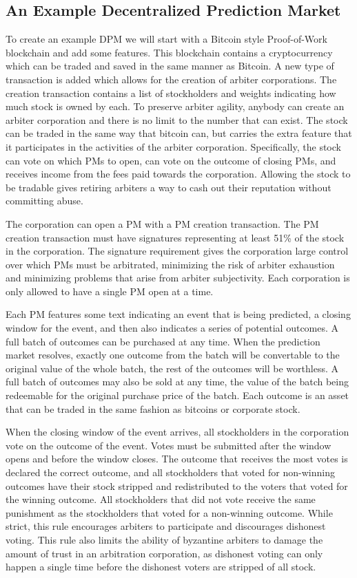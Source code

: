 \documentclass[onecolumn]{article}
\begin{document}
\subsection{An Example Decentralized Prediction Market}
To create an example DPM we will start with a Bitcoin style Proof-of-Work blockchain and add some features.
This blockchain contains a cryptocurrency which can be traded and saved in the same manner as Bitcoin.
A new type of transaction is added which allows for the creation of arbiter corporations.
The creation transaction contains a list of stockholders and weights indicating how much stock is owned by each.
To preserve arbiter agility, anybody can create an arbiter corporation and there is no limit to the number that can exist.
The stock can be traded in the same way that bitcoin can, but carries the extra feature that it participates in the activities of the arbiter corporation.
Specifically, the stock can vote on which PMs to open, can vote on the outcome of closing PMs, and receives income from the fees paid towards the corporation.
Allowing the stock to be tradable gives retiring arbiters a way to cash out their reputation without committing abuse.

The corporation can open a PM with a PM creation transaction.
The PM creation transaction must have signatures representing at least 51\% of the stock in the corporation.
The signature requirement gives the corporation large control over which PMs must be arbitrated, minimizing the risk of arbiter exhaustion and minimizing problems that arise from arbiter subjectivity.
Each corporation is only allowed to have a single PM open at a time.

Each PM features some text indicating an event that is being predicted, a closing window for the event, and then also indicates a series of potential outcomes.
A full batch of outcomes can be purchased at any time.
When the prediction market resolves, exactly one outcome from the batch will be convertable to the original value of the whole batch, the rest of the outcomes will be worthless.
A full batch of outcomes may also be sold at any time, the value of the batch being redeemable for the original purchase price of the batch.
Each outcome is an asset that can be traded in the same fashion as bitcoins or corporate stock.

When the closing window of the event arrives, all stockholders in the corporation vote on the outcome of the event.
Votes must be submitted after the window opens and before the window closes.
The outcome that receives the most votes is declared the correct outcome, and all stockholders that voted for non-winning outcomes have their stock stripped and redistributed to the voters that voted for the winning outcome.
All stockholders that did not vote receive the same punishment as the stockholders that voted for a non-winning outcome.
While strict, this rule encourages arbiters to participate and discourages dishonest voting.
This rule also limits the ability of byzantine arbiters to damage the amount of trust in an arbitration corporation, as dishonest voting can only happen a single time before the dishonest voters are stripped of all stock.
\end{document}
